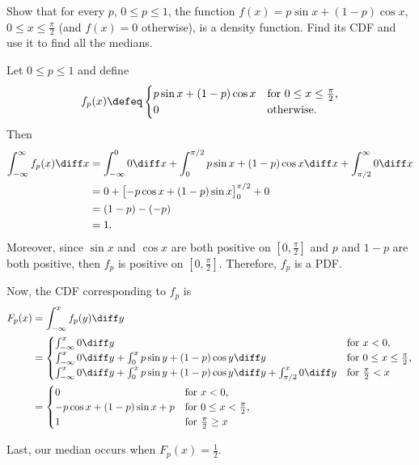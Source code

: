 \begin{problem}[Handout 12, \# 16]
  Show that for every \(p\), \(0\leq p\leq 1\), the function
  \(f(x)=p\sin x+(1-p)\cos x\), \(0\leq x\leq\frac{\pi}{2}\) (and
  \(f(x)=0\) otherwise), is a density function. Find its CDF and use it to
  find all the medians.
\end{problem}
\begin{solution}
  Let \(0\leq p\leq 1\) and define
  \[
    f_p(x)\defeq
    \begin{cases}
      p\sin x+(1-p)\cos x&\text{for \(0\leq x\leq\frac{\pi}{2}\),}\\
      0&\text{otherwise.}
    \end{cases}
  \]
  Then
  \begin{align*}
    \int_{-\infty}^\infty f_p(x)\diff x
    &=\int_{-\infty}^0 0\diff x%
      +\int_0^{\pi/2} p \sin x + (1-p) \cos x \diff x%
      +\int_{\pi/2}^\infty 0\diff x\\
    &=0%
      +\bigl[-p\cos x+(1-p)\sin x\bigr]_0^{\pi/2}%
      +0\\
    &=(1-p)-(-p)\\
    &=1.
  \end{align*}
  Moreover, since $\sin x$ and $\cos x$ are both positive on
  $[0,\frac{\pi}{2}]$ and $p$ and $1-p$ are both positive, then $f_p$ is
  positive on $[0,\frac{\pi}{2}]$. Therefore, $f_p$ is a PDF.

  Now, the CDF corresponding to $f_p$ is
  \begin{align*}
    F_p(x)
    &=\int_{-\infty}^x f_p(y) \diff y \\
    &=\begin{cases}
      \int_{-\infty}^x 0 \diff y &\text{for \(x<0\),}\\
      \int_{-\infty}^x 0 \diff y%
      +\int_0^x p\sin y+(1-p)\cos y\diff y&\text{for \(0\leq x\leq\frac{\pi}{2}\),}\\
      \int_{-\infty}^x 0 \diff y%
      +\int_0^x p\sin y+(1-p)\cos y\diff y%
      +\int_{\pi/2}^x 0 \diff y%
      &\text{for \(\frac{\pi}{2}<x\)}
    \end{cases}\\
    &=\begin{cases}
      0&\text{for \(x<0\),}\\
      -p\cos x+(1-p)\sin x+p&\text{for \(0\leq x<\frac{\pi}{2}\),}\\
      1&\text{for \(\frac{\pi}{2}\geq x\)}
      \end{cases}
  \end{align*}

  Last, our median occurs when $F_p(x) = \frac{1}{2}$.
\end{solution}
\newpage

